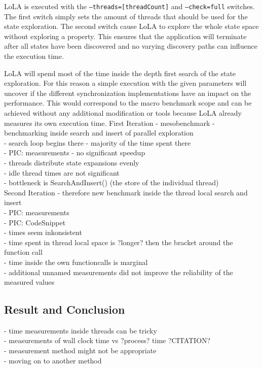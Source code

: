 LoLA is executed with the \texttt{--threads=[threadCount]} and \texttt{--check=full} switches. The first switch simply sets the amount of threads that should be used for the state exploration. The second switch cause LoLA to explore the whole state space without exploring a property. This ensures that the application will terminate after all states have been discovered and no varying discovery paths can influence the execution time.

LoLA will spend most of the time inside the depth first search of the state exploration. For this reason a simple execution with the given parameters will uncover if the different synchronization implementations have an impact on the performance. This would correspond to the macro benchmark scope and can be achieved without any additional modification or tools because LoLA already measures its own execution time.
First Iteration
- mesobenchmark
- benchmarking inside search and insert of parallel exploration\\
- search loop begins there - majority of the time spent there\\
- PIC: measurements
- no significant speedup\\
- threads distribute state expansions evenly\\
- idle thread times are not significant\\
- bottleneck is SearchAndInsert() (the store of the individual thread)\\

Second Iteration
- therefore new benchmark inside the thread local search and insert\\
- PIC: measurements\\
- PIC: CodeSnippet\\
- times seem inkonsistent\\
- time spent in thread local space is ?longer? then the bracket around the function call\\
- time inside the own functioncalls is marginal\\
- additional unnamed measurements did not improve the reliability of the measured values\\

\subsection{Result and Conclusion}
- time measurements inside threads can be tricky\\
- measurements of wall clock time vs ?process? time ?CITATION?\\
- measurement method might not be appropriate \\
- moving on to another method\\


